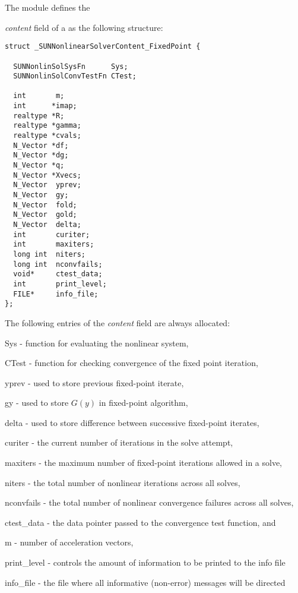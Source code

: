 The {\sunnonlinsolfixedpoint} module defines the {\textit{content} field of a
 as the following structure:
\begin{verbatim}
struct _SUNNonlinearSolverContent_FixedPoint {

  SUNNonlinSolSysFn      Sys;
  SUNNonlinSolConvTestFn CTest;

  int       m;
  int      *imap;
  realtype *R;
  realtype *gamma;
  realtype *cvals;
  N_Vector *df;
  N_Vector *dg;
  N_Vector *q;
  N_Vector *Xvecs;
  N_Vector  yprev;
  N_Vector  gy;
  N_Vector  fold;
  N_Vector  gold;
  N_Vector  delta;
  int       curiter;
  int       maxiters;
  long int  niters;
  long int  nconvfails;
  void*     ctest_data;
  int       print_level;
  FILE*     info_file;
};
\end{verbatim}
The following entries of the \emph{content} field are always
allocated:
\begin{args}
  \item[Sys]          - function for evaluating the nonlinear system,
  \item[CTest]        - function for checking convergence of the fixed point iteration,
  \item[yprev]        -  used to store previous fixed-point iterate,
  \item[gy]           -  used to store $G(y)$ in fixed-point algorithm,
  \item[delta]        -  used to store difference between successive fixed-point iterates,
  \item[curiter]      - the current number of iterations in the solve attempt,
  \item[maxiters]     - the maximum number of fixed-point iterations allowed in
                        a solve,
  \item[niters]       - the total number of nonlinear iterations across all
                        solves,
  \item[nconvfails]   - the total number of nonlinear convergence failures across
                        all solves,
  \item[ctest\_data]  - the data pointer passed to the convergence test function, and
  \item[m]            - number of acceleration vectors,
  \item[print\_level] - controls the amount of information to be printed to the info file
  \item[info\_file]   - the file where all informative (non-error) messages will be directed
\end{args}
\vspace{1em}

}
